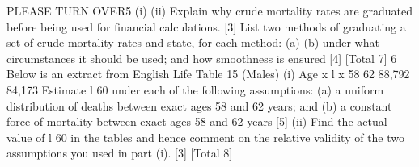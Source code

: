 \documentclass[a4paper,12pt]{article}
\begin{document}
\begin{enumerate}
[Total 7]
PLEASE TURN OVER5
(i)
(ii)
Explain why crude mortality rates are graduated before being used for
financial calculations.
[3]
List two methods of graduating a set of crude mortality rates and state, for
each method:
(a)
(b)
under what circumstances it should be used; and
how smoothness is ensured
[4]
[Total 7]
6
Below is an extract from English Life Table 15 (Males)
(i)
Age x l x
58
62 88,792
84,173
Estimate l 60 under each of the following assumptions:
(a) a uniform distribution of deaths between exact ages 58 and 62 years;
and
(b) a constant force of mortality between exact ages 58 and 62 years
[5]
(ii)
Find the actual value of l 60 in the tables and hence comment on the relative
validity of the two assumptions you used in part (i).
[3]
[Total 8]


\end{enumerate}
\end{document}
